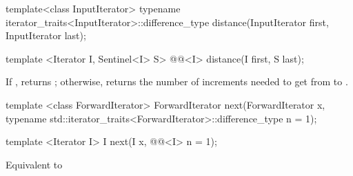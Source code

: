 %
\begin{removedblock}
\begin{itemdecl}
  template<class InputIterator>
      typename iterator_traits<InputIterator>::difference_type
         distance(InputIterator first, InputIterator last);
\end{itemdecl}
\end{removedblock}
\begin{addedblock}
\begin{itemdecl}
template <Iterator I, Sentinel<I> S>
  @@<I> distance(I first, S last);
\end{itemdecl}
\end{addedblock}

\begin{itemdescr}
\pnum
{}

\pnum
\effects
If 
\brk{}, returns ; otherwise,
returns the number of increments needed to get from
to
.

\pnum
{}
\end{itemdescr}

%
\begin{removedblock}
\begin{itemdecl}
template <class ForwardIterator>
  ForwardIterator next(ForwardIterator x,
    typename std::iterator_traits<ForwardIterator>::difference_type n = 1);
\end{itemdecl}
\end{removedblock}
\begin{addedblock}
\begin{itemdecl}
template <Iterator I>
  I next(I x, @@<I> n = 1);
\end{itemdecl}
\end{addedblock}

\begin{itemdescr}
\pnum
\effects Equivalent to 
\end{itemdescr}

